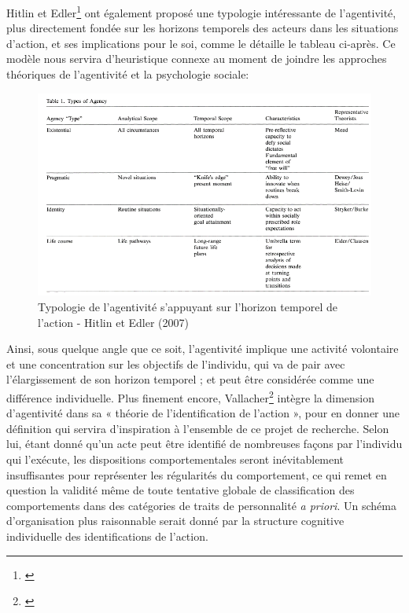 Hitlin et Edler\footnote{\cite{hitlin_time_2007}} ont également proposé une typologie intéressante de l'agentivité, plus directement fondée sur les horizons temporels des acteurs dans les situations d'action, et ses implications pour le soi, comme le détaille le tableau ci-après. Ce modèle nous servira d’heuristique connexe au moment de joindre les approches théoriques de l’agentivité et la psychologie sociale: 

\begin{figure}[!ht]
    \centering
    \includegraphics[width=16cm]{img/Types of agency.png}
    \caption{Typologie de l'agentivité s'appuyant sur l'horizon temporel de l'action - Hitlin et Edler (2007)}
    \label{Types_of_agency}
\end{figure}

Ainsi, sous quelque angle que ce soit, l’agentivité implique une activité volontaire et une concentration sur les objectifs de l'individu, qui va de pair avec l’élargissement de son horizon temporel ; et peut être considérée comme une différence individuelle. Plus finement encore, Vallacher\footnote{\cite{vallacher_levels_1989}} intègre la dimension d’agentivité dans sa « théorie de l'identification de l'action », pour en donner une définition qui servira d'inspiration à l'ensemble de ce projet de recherche. Selon lui, étant donné qu'un acte peut être identifié de nombreuses façons par l’individu qui l’exécute, les dispositions comportementales seront inévitablement insuffisantes pour représenter les régularités du comportement, ce qui remet en question la validité même de toute tentative globale de classification des comportements dans des catégories de traits de personnalité \textit{a priori}. Un schéma d'organisation plus raisonnable serait donné par la structure cognitive individuelle des identifications de l’action.

